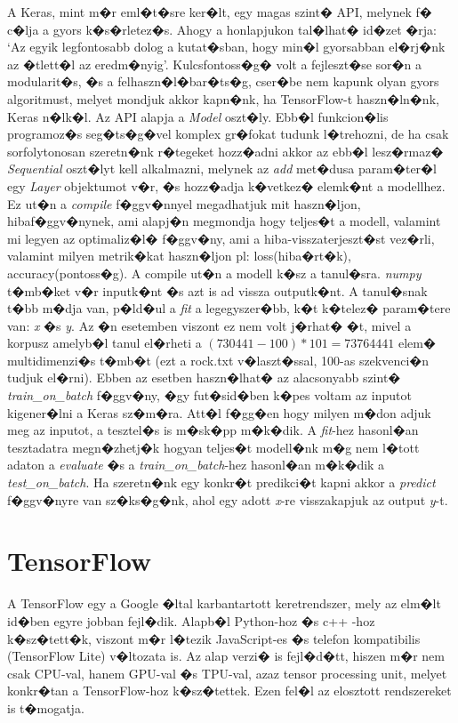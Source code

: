 \documentclass[12pt]{report}
\theoremstyle{definition}
\begin{document}
A Keras, mint m�r eml�t�sre ker�lt, egy magas szint� API, melynek f� c�lja a 
gyors k�s�rletez�s. Ahogy a honlapjukon tal�lhat� id�zet �rja: `Az egyik 
legfontosabb dolog a kutat�sban, hogy min�l gyorsabban el�rj�nk az �tlett�l az 
eredm�nyig'. Kulcsfontoss�g� volt a fejleszt�se sor�n a modularit�s, �s a 
felhaszn�l�bar�ts�g, cser�be nem kapunk olyan gyors algoritmust, melyet mondjuk 
akkor kapn�nk, ha TensorFlow-t haszn�ln�nk, Keras n�lk�l.
Az API alapja a \textit{Model} oszt�ly. Ebb�l funkcion�lis programoz�s 
seg�ts�g�vel komplex gr�fokat tudunk l�trehozni, de ha csak sorfolytonosan 
szeretn�nk r�tegeket hozz�adni akkor az ebb�l lesz�rmaz�
\textit{Sequential} oszt�lyt kell alkalmazni, melynek az \textit{add} met�dusa param�ter�l egy \textit{Layer} objektumot v�r, �s hozz�adja k�vetkez� elemk�nt a modellhez. Ez ut�n a \textit{compile} f�ggv�nnyel megadhatjuk mit haszn�ljon, hibaf�ggv�nynek, ami alapj�n megmondja hogy teljes�t a modell, valamint mi legyen az optimaliz�l� f�ggv�ny, ami a hiba-visszaterjeszt�st vez�rli, valamint milyen metrik�kat haszn�ljon pl: loss(hiba�rt�k), accuracy(pontoss�g).
A compile ut�n a modell k�sz a tanul�sra. \textit{numpy} t�mb�ket v�r inputk�nt 
�s azt is ad vissza outputk�nt. A tanul�snak t�bb m�dja van, p�ld�ul a 
\textit{fit} a legegyszer�bb, k�t k�telez� param�tere van: \textit{x} �s 
\textit{y}. 
Az �n esetemben viszont ez nem volt j�rhat� �t, mivel a korpusz amelyb�l tanul 
el�rheti a $(730441-100) * 101 = 73764441$ elem� multidimenzi�s t�mb�t (ezt a 
rock.txt v�laszt�ssal, 100-as szekvenci�n tudjuk el�rni). Ebben az esetben 
haszn�lhat� az alacsonyabb szint� \textit{train\_on\_batch} f�ggv�ny, �gy 
fut�sid�ben k�pes voltam az inputot kigener�lni a Keras sz�m�ra.
Att�l f�gg�en hogy milyen m�don adjuk meg az inputot, a tesztel�s is m�sk�pp m�k�dik. A \textit{fit}-hez hasonl�an tesztadatra megn�zhetj�k hogyan teljes�t modell�nk m�g nem l�tott adaton a \textit{evaluate} �s a \textit{train\_on\_batch}-hez hasonl�an m�k�dik a \textit{test\_on\_batch}. Ha szeretn�nk egy konkr�t predikci�t kapni akkor a \textit{predict} f�ggv�nyre van sz�ks�g�nk, ahol egy adott \textit{x}-re visszakapjuk az output \textit{y}-t.

\section{TensorFlow}
A TensorFlow egy a Google �ltal karbantartott keretrendszer, mely az elm�lt 
id�ben egyre jobban fejl�dik. Alapb�l Python-hoz �s c++ -hoz k�sz�tett�k, 
viszont m�r l�tezik JavaScript-es �s telefon kompatibilis (TensorFlow Lite) 
v�ltozata is.
Az alap verzi� is fejl�d�tt, hiszen m�r nem csak CPU-val, hanem GPU-val �s 
TPU-val, azaz tensor processing unit, melyet konkr�tan a TensorFlow-hoz 
k�sz�tettek. Ezen fel�l az elosztott rendszereket is t�mogatja.
\end{document}
